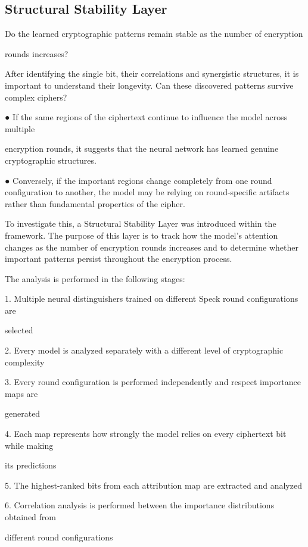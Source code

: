 \subsection{Structural Stability Layer}

Do the learned cryptographic patterns remain stable as the number of encryption 

rounds increases? 

After identifying the single bit, their correlations and synergistic structures, it is important to 
understand their longevity. Can these discovered patterns survive complex ciphers?  

●  If the same regions of the ciphertext continue to influence the model across multiple 

encryption rounds, it suggests that the neural network has learned genuine cryptographic 
structures.  

●  Conversely, if the important regions change completely from one round configuration to 
another, the model may be relying on round-specific artifacts rather than fundamental 
properties of the cipher. 

To investigate this, a Structural Stability Layer was introduced within the framework. The 
purpose of this layer is to track how the model's attention changes as the number of encryption 
rounds increases and to determine whether important patterns persist throughout the encryption 
process. 

The analysis is performed in the following stages: 

1.  Multiple neural distinguishers trained on different Speck round configurations are 

selected 

2.  Every model is analyzed separately with a different level of cryptographic complexity 

3.  Every round configuration is performed independently and respect importance maps are 

generated 

4.  Each map represents how strongly the model relies on every ciphertext bit while making 

its predictions 

5.  The highest-ranked bits from each attribution map are extracted and analyzed 

6.  Correlation analysis is performed between the importance distributions obtained from 

different round configurations 

